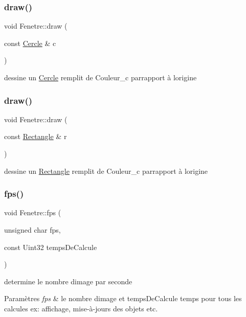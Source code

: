 \subsubsection{\texorpdfstring{draw()}{draw()}\hspace{0.1cm}{\footnotesize\ttfamily [1/2]}}
{\footnotesize\ttfamily void Fenetre\+::draw (\begin{DoxyParamCaption}\item[{const \mbox{\hyperlink{class_cercle}{Cercle}} \&}]{c }\end{DoxyParamCaption})}

dessine un \mbox{\hyperlink{class_cercle}{Cercle}} remplit de Couleur\+\_\+c parrapport à l\textquotesingle{}origine \mbox{\label{class_fenetre_a5d99f4f07fa6a89793f67303b98fb526}} 
\subsubsection{\texorpdfstring{draw()}{draw()}\hspace{0.1cm}{\footnotesize\ttfamily [2/2]}}
{\footnotesize\ttfamily void Fenetre\+::draw (\begin{DoxyParamCaption}\item[{const \mbox{\hyperlink{class_rectangle}{Rectangle}} \&}]{r }\end{DoxyParamCaption})}

dessine un \mbox{\hyperlink{class_rectangle}{Rectangle}} remplit de Couleur\+\_\+c parrapport à l\textquotesingle{}origine \mbox{\label{class_fenetre_aa2272c38f9dcd34a4e819ab26d22d881}} 
\subsubsection{\texorpdfstring{fps()}{fps()}}
{\footnotesize\ttfamily void Fenetre\+::fps (\begin{DoxyParamCaption}\item[{unsigned char}]{fps,  }\item[{const Uint32}]{temps\+De\+Calcule }\end{DoxyParamCaption})}



determine le nombre d\textquotesingle{}image par seconde 


\begin{DoxyParams}{Paramètres}
{\em fps} & le nombre d\textquotesingle{}image et temps\+De\+Calcule temps pour tous les calcules ex\+: affichage, mise-\/à-\/jours des objets etc. \\
\hline
\end{DoxyParams}
\mbox{\label{class_fenetre_a509d4b42356b63541d23532f79d65d7e}} 
